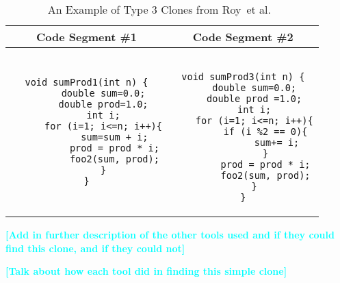 \documentclass[smallextended]{svjour3}       %
\newcommand{\todo}[1]{\textcolor{cyan}{\textbf{[#1]}}}
\newcommand{\sam}[1]{\textcolor{green}{{\it [Sam says: #1]}}}
\begin{document}




\noindent
\begin{table*}
\centering
\begin{tabular}{c | c}
\bfseries Code Segment \#1  & \bfseries Code Segment \#2 \\ \hline \hline
\begin{lstlisting}
void sumProd1(int n) {
	  double sum=0.0;
	  double prod=1.0;
	  int i;
	  for (i=1; i<=n; i++){
		  sum=sum + i;
		  prod = prod * i;
		  foo2(sum, prod);
	  }
}
\end{lstlisting}
&
\begin{lstlisting}

void sumProd3(int n) {
	double sum=0.0;
	double prod =1.0;
	int i;
	for (i=1; i<=n; i++){
		if (i %2 == 0){
			sum+= i;
		}
		prod = prod * i;
		foo2(sum, prod);
	}
}
\end{lstlisting}

\end{tabular}
\caption{An Example of Type 3 Clones from Roy~et al.~\label{table:roy_type3}}
\end{table*}

\todo{Add in further description of the other tools used and if they could find this clone, and if they could not}


\todo{Talk about how each tool did in finding this simple clone}


\end{document}
